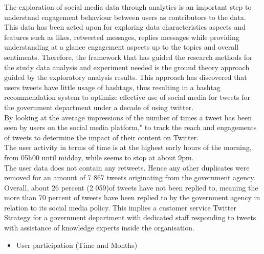 The exploration of social media data through analytics is an important step to understand engagement behaviour between users as contributors to the data.  This data has been acted upon for exploring data characteristics aspects and features such as likes, retweeted messages, replies messages while providing understanding at a glance engagement aspects up to the topics and overall sentiments.  Therefore, the framework that has guided the research methods for the study data analysis and experiment needed is the ground theory approach guided by the exploratory analysis results.  This approach has discovered that users tweets have little usage of hashtags, thus resulting in a hashtag recommendation system to optimize effective use of social media for tweets for the government department under a decade of using twitter.\\
By looking at the average impressions of the number of times a tweet has been seen by users on the social media platform," to track the reach and engagements of tweets to determine the impact of their content on Twitter.\\
The user activity in terms of time is at the highest early hours of the morning, from 05h00 until midday, while seems to stop at about 9pm.\\
The user data does not contain any retweets.  Hence any other duplicates were removed for an amount of 7 867 tweets originating from the government agency.\\
Overall, about 26 percent (2 059)of tweets have not been replied to, meaning the more than 70 percent of tweets have been replied to by the government agency in relation to its social media policy.  This implies a customer service Twitter Strategy for a government department with dedicated staff responding to tweets with assistance of knowledge experts inside the organisation.\\

\begin{itemize}
    \item User participation (Time and Months)
\end{itemize}


